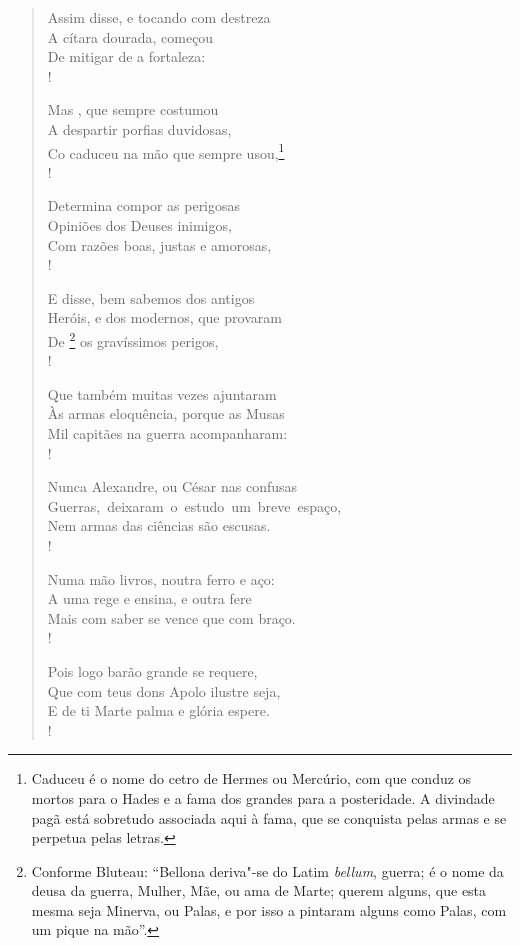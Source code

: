 \begin{verse}
Assim disse, e tocando com destreza\\
A cítara dourada, começou\\
De mitigar de  a fortaleza:\\!

Mas , que sempre costumou\\
A despartir porfias duvidosas,\\
Co caduceu na mão que sempre usou,\footnote{ Caduceu é o nome do cetro de
Hermes ou Mercúrio, com que conduz os mortos para o Hades e a fama dos
grandes para a posteridade. A divindade pagã está sobretudo associada
aqui à fama, que se conquista pelas armas e se perpetua pelas letras.}\\!

Determina compor as perigosas\\
Opiniões dos Deuses inimigos,\\
Com razões boas, justas e amorosas,\\! \EP[1]

E disse, bem sabemos dos antigos\\
Heróis, e dos modernos, que provaram\\
De \footnote{ Conforme Bluteau: ``Bellona deriva"-se do
Latim \textit{bellum}, guerra; é o nome da deusa da guerra, Mulher,
Mãe, ou ama de Marte; querem alguns, que esta mesma seja Minerva, ou
Palas, e por isso a pintaram alguns como Palas, com um pique na mão''.} os gravíssimos perigos,\\!

Que também muitas vezes ajuntaram\\
Às armas eloquência, porque as Musas\\
Mil capitães na guerra acompanharam:\\!

Nunca Alexandre, ou César nas confusas\\ 	 
\mbox{Guerras, deixaram o estudo um breve espaço,}\\
\vspace{-3ex}Nem armas das ciências são escusas.\\!

Numa mão livros, noutra ferro e aço:\\
A uma rege e ensina, e outra fere\\
Mais com saber se vence que com braço.\\!

Pois logo barão grande se requere,\\
Que com teus dons Apolo ilustre seja,\\
E de ti Marte palma e glória espere.\\!


\end{verse}
